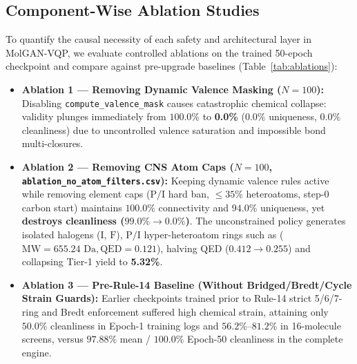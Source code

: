 \documentclass[10pt,a4paper]{article}
\begin{document}
\vspace{-0.30cm}
\subsection{Component-Wise Ablation Studies}
To quantify the causal necessity of each safety and architectural layer in MolGAN-VQP, we evaluate controlled ablations on the trained 50-epoch checkpoint and compare against pre-upgrade baselines (Table~\ref{tab:ablations}):
\begin{itemize}[noitemsep,topsep=1pt,parsep=0pt]
    \item \textbf{Ablation 1 --- Removing Dynamic Valence Masking ($N=100$):} Disabling \texttt{compute\_valence\_mask} causes catastrophic chemical collapse: validity plunges immediately from $100.0\%$ to \textbf{0.0\%} ($0.0\%$ uniqueness, $0.0\%$ cleanliness) due to uncontrolled valence saturation and impossible bond multi-closures.
    \item \textbf{Ablation 2 --- Removing CNS Atom Caps ($N=100$, \texttt{ablation\_no\_atom\_filters.csv}):} Keeping dynamic valence rules active while removing element caps ($\mathrm{P}/\mathrm{I}$ hard ban, $\le 35\%$ heteroatoms, step-0 carbon start) maintains $100.0\%$ connectivity and $94.0\%$ uniqueness, yet \textbf{destroys cleanliness ($99.0\% \to \mathbf{0.0\%}$)}. The unconstrained policy generates isolated halogens ($\mathrm{I}$, $\mathrm{F}$), $\mathrm{P}/\mathrm{I}$ hyper-heteroatom rings such as \texttt{} ($\mathrm{MW}=655.24\text{ Da}, \mathrm{QED}=0.121$), halving QED ($0.412 \to 0.255$) and collapsing Tier-1 yield to \textbf{5.32\%}.
    \item \textbf{Ablation 3 --- Pre-Rule-14 Baseline (Without Bridged/Bredt/Cycle Strain Guards):} Earlier checkpoints trained prior to Rule-14 strict 5/6/7-ring and Bredt enforcement suffered high chemical strain, attaining only $50.0\%$ cleanliness in Epoch-1 training logs and $56.2\%$--$81.2\%$ in 16-molecule screens, versus $97.88\%$ mean / $100.0\%$ Epoch-50 cleanliness in the complete engine.
\end{itemize}
\end{document}
